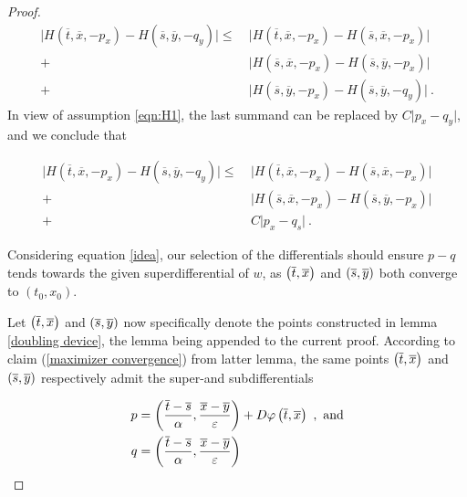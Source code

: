 \begin{theorem}
\begin{proof}
		  		\begin{equation*}
		  		\begin{split}
		  		\lvert H(\overline{t}, \overline{x}, -p_x) - H(\overline{s}, \overline{y}, -q_y) \rvert \leq \
		  		&\lvert H(\overline{t}, \overline{x}, -p_x) - H(\overline{s}, \overline{x}, -p_x) \rvert \\
		  		+&\lvert H(\overline{s}, \overline{x}, -p_x) - H(\overline{s}, \overline{y}, -p_x) \rvert \\
		  		+&\lvert H(\overline{s}, \overline{y}, -p_x) - H(\overline{s}, \overline{y}, -q_y) \rvert \ .
		  		\end{split} 
		  		\end{equation*}
		  		In view of assumption \eqref{eqn:H1}, the last summand can be replaced by $ C \lvert p_x - q_y \rvert $, and we conclude that
		  		
		  		\begin{equation}
		  		\label{idea}
		  		\begin{split}
		  		\lvert H(\overline{t}, \overline{x}, -p_x) - H(\overline{s}, \overline{y}, -q_y) \rvert \leq \
		  		&\lvert H(\overline{t}, \overline{x}, -p_x) - H(\overline{s}, \overline{x}, -p_x) \rvert \\
		  		+&\lvert H(\overline{s}, \overline{x}, -p_x) - H(\overline{s}, \overline{y}, -p_x) \rvert \\
		  		+& C \lvert p_x - q_s \rvert \ .
		  		\end{split}
		  		\end{equation}
		  		
		  		Considering equation \eqref{idea}, our selection of the differentials should ensure $ p - q $ tends towards the given superdifferential of $ w $, as $ \left(\overline{t}, \overline{x}\right) $ and $ \left(\overline{s}, \overline{y}\right) $ both converge to $ (t_0, x_0) $.
		  		
		  		Let $ \left(\overline{t}, \overline{x}\right) $ and $ \left(\overline{s}, \overline{y}\right) $ now specifically denote the points constructed in lemma \ref{doubling device}, the lemma being appended to the current proof. According to claim (\ref{maximizer convergence}) from latter lemma, the same points $ \left(\overline{t}, \overline{x}\right) $ and $ \left(\overline{s}, \overline{y}\right) $ respectively admit the super-and subdifferentials
		  		
		  		\begin{align*}
		  				p &= \left( \frac{\overline{t} - \overline{s}}{\alpha}, \frac{\overline{x} - \overline{y}}{\varepsilon} \right) + D\varphi\left(\overline{t}, \overline{x}\right) \ , \text{ and} \\
		  			q &= \left( \frac{\overline{t} - \overline{s}}{\alpha}, \frac{\overline{x} - \overline{y}}{\varepsilon} \right)
		  		\end{align*}
		  		

\end{proof}
\end{theorem}
